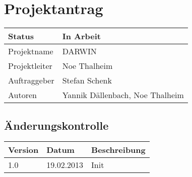 \documentclass{scrartcl}
\begin{document}
	\section*{Projektantrag}
	
	\begin{tabularx}{\textwidth}{| X | X |}
	\hline
	Status & In Arbeit\\
	\hline
	Projektname & DARWIN\\
	\hline
	Projektleiter & Noe Thalheim\\
	\hline
	Auftraggeber & Stefan Schenk\\
	\hline
	Autoren & Yannik Dällenbach, Noe Thalheim\\
	\hline
	\end{tabularx}
	
	\subsection*{Änderungskontrolle}
	\begin{tabularx}{\textwidth}{| X | X | X |}
	\hline
	\rowcolor[gray]{0.9} Version & Datum & Beschreibung\\
	\hline
	1.0 & 19.02.2013 & Init\\
	\hline
	\end{tabularx}

	\pagebreak
	\tableofcontents
	\pagebreak
	
	
	
	
\end{document}
